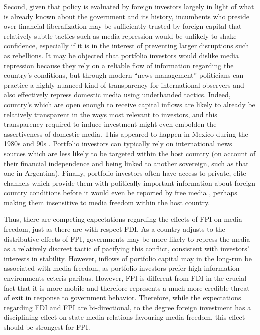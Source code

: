 \documentclass[12pt,a4paper]{article}\usepackage[]{graphicx}\usepackage[]{color}
\begin{document}
Second, given that policy is evaluated by foreign investors largely in light of what is already known about the government and its history, incumbents who preside over financial liberalization may be sufficiently trusted by foreign capital that relatively subtle tactics such as media repression would be unlikely to shake confidence, especially if it is in the interest of preventing larger disruptions such as rebellions. It may be objected that portfolio investors would dislike media repression because they rely on a reliable flow of information regarding the country's conditions, but through modern “news management” politicians can practice a highly nuanced kind of transparency for international observers and also effectively repress domestic media using underhanded tactics. Indeed, country's which are open enough to receive capital inflows are likely to already be relatively transparent in the ways most relevant to investors, and this transparency required to induce investment might even embolden the assertiveness of domestic media. This appeared to happen in Mexico during the 1980s and 90s \parencite{lawson2002building}. Portfolio investors can typically rely on international news sources which are less likely to be targeted within the host country (on account of their financial independence and being linked to another sovereign, such as that one in Argentina). Finally, portfolio investors often have access to private, elite channels which provide them with politically important information about foreign country conditions before it would even be reported by free media \parencite{Dube:2011ir}, perhaps making them insensitive to media freedom within the host country.

Thus, there are competing expectations regarding the effects of FPI on media freedom, just as there are with respect FDI. As a country adjusts to the distributive effects of FPI, governments may be more likely to repress the media as a relatively discreet tactic of pacifying this conflict, consistent with investors' interests in stability. However, inflows of portfolio capital may in the long-run be associated with media freedom, as portfolio investors prefer high-information environments ceteris paribus. However, FPI is different from FDI in the crucial fact that it is more mobile and therefore represents a much more credible threat of exit in response to government behavior. Therefore, while the expectations regarding FDI and FPI are bi-directional, to the degree foreign investment has a disciplining effect on state-media relations favouring media freedom, this effect should be strongest for FPI.
\end{document}
